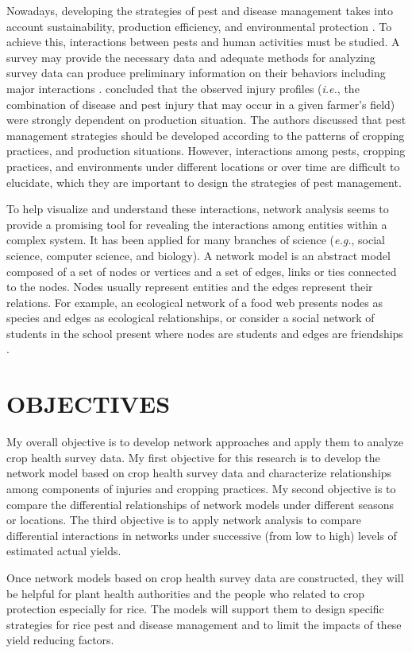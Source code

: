 Nowadays, developing the strategies of pest and disease management takes into account sustainability, production efficiency, and environmental protection . To achieve this, interactions between pests and human activities must be studied. A survey may provide the necessary data and adequate methods for analyzing survey data can produce preliminary information on their behaviors including major interactions .  concluded that the observed injury profiles (\textit{i.e.}, the combination of disease and pest injury that may occur in a given farmer's field) were strongly dependent on production situation.  The authors discussed that pest management strategies should be developed according to the patterns of cropping practices, and production situations. However, interactions among pests, cropping practices, and environments under different locations or over time are difficult to elucidate, which they are important to design the strategies of pest management.

To help visualize and understand these interactions, network analysis seems to provide a promising tool for revealing the interactions among entities within a complex system. It has been applied for many branches of science (\textit{e.g.}, social science, computer science, and biology). A network model is an abstract model composed of a set of nodes or vertices and a set of edges, links or ties connected to the nodes. Nodes usually represent entities and the edges represent their relations. For example, an ecological network of a food web presents nodes as species  and edges as ecological relationships, or consider a social network of students in the school present where nodes are students and edges are friendships .

\section*{OBJECTIVES}

My overall objective is to develop network approaches and apply them to analyze crop health survey data. My first objective for this research is to develop the network model based on crop health survey data and characterize relationships among components of injuries and cropping practices. My second objective is to compare the differential relationships of network models under different seasons or locations. The third objective is to apply network analysis to compare differential interactions in networks under successive (from low to high) levels of estimated actual yields.

Once network models based on crop health survey data are constructed, they will be helpful for plant health authorities and the people who related to crop protection especially for rice. The models will support them to design specific strategies for rice pest and disease management and to limit the impacts of these yield reducing factors.  

